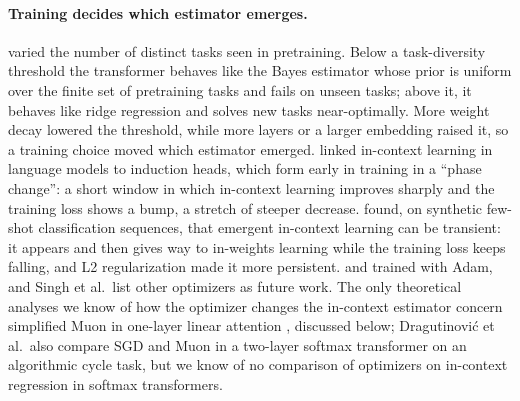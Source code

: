 \paragraph{Training decides which estimator emerges.} \citet{raventos2023} varied the number of distinct tasks seen in pretraining. Below a task-diversity threshold the transformer behaves like the Bayes estimator whose prior is uniform over the finite set of pretraining tasks and fails on unseen tasks; above it, it behaves like ridge regression and solves new tasks near-optimally. More weight decay lowered the threshold, while more layers or a larger embedding raised it, so a training choice moved which estimator emerged. \citet{olsson2022} linked in-context learning in language models to induction heads, which form early in training in a ``phase change'': a short window in which in-context learning improves sharply and the training loss shows a bump, a stretch of steeper decrease. \citet{singh2023} found, on synthetic few-shot classification sequences, that emergent in-context learning can be transient: it appears and then gives way to in-weights learning while the training loss keeps falling, and L2 regularization made it more persistent. \citet{raventos2023} and \citet{singh2023} trained with Adam, and Singh et al.\ list other optimizers as future work. The only theoretical analyses we know of how the optimizer changes the in-context estimator concern simplified Muon in one-layer linear attention \citep{dragutinovic2026,ma2026}, discussed below; Dragutinovi\'c et al.\ also compare SGD and Muon in a two-layer softmax transformer on an algorithmic cycle task, but we know of no comparison of optimizers on in-context regression in softmax transformers.

